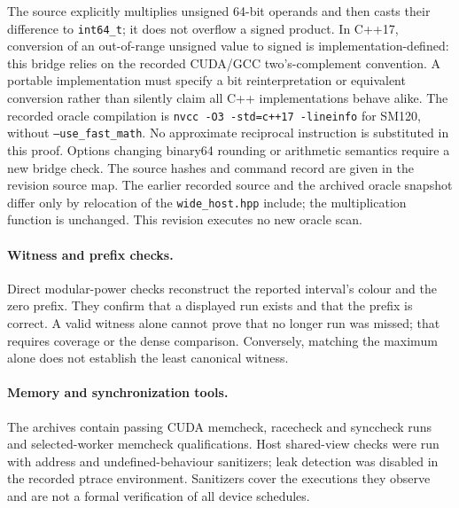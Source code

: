 \documentclass[11pt]{article}
\theoremstyle{definition}\newtheorem{remark}[theorem]{Remark}
\begin{document}
The source explicitly multiplies unsigned 64-bit operands and then casts
their difference to \texttt{int64\_t}; it does not overflow a signed
product. In C++17, conversion of an out-of-range unsigned value to signed
is implementation-defined: this bridge relies on the recorded CUDA/GCC
two's-complement convention. A portable implementation must specify a
bit reinterpretation or equivalent conversion rather than silently claim
all C++ implementations behave alike. The recorded oracle compilation is
\texttt{nvcc -O3 -std=c++17 -lineinfo} for SM120, without
\texttt{--use\_fast\_math}. No approximate reciprocal instruction is
substituted in this proof. Options changing binary64 rounding or arithmetic
semantics require a new bridge check. The source hashes and command
record are given in the revision source map. The earlier recorded source
and the archived oracle snapshot differ only by relocation of the
\texttt{wide\_host.hpp} include; the multiplication function is unchanged.
This revision executes no new oracle scan.

\paragraph{Witness and prefix checks.}
Direct modular-power checks reconstruct the reported interval's colour and
the zero prefix. They confirm that a displayed run exists and that the
prefix is correct. A valid witness alone cannot prove that no longer run
was missed; that requires coverage or the dense comparison. Conversely,
matching the maximum alone does not establish the least canonical witness.

\paragraph{Memory and synchronization tools.}
The archives contain passing CUDA memcheck, racecheck and synccheck runs
and selected-worker memcheck qualifications. Host shared-view checks were
run with address and undefined-behaviour sanitizers; leak detection was
disabled in the recorded ptrace environment. Sanitizers cover the executions
they observe and are not a formal verification of all device schedules.
\end{document}
